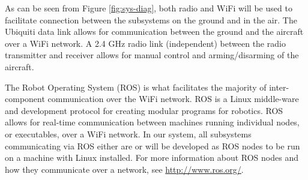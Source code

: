 \documentclass[]{auvsi_doc}
\begin{document}
As can be seen from Figure \ref{fig:sys-diag}, both radio and WiFi will be used to facilitate connection between the subsystems on the ground and in the air. The Ubiquiti data link allows for communication between the ground and the aircraft over a WiFi network. A 2.4 GHz radio link (independent) between the radio transmitter and receiver allows for manual control and arming/disarming of the aircraft.

The Robot Operating System (ROS) is what facilitates the majority of inter-component communication over the WiFi network. ROS is a Linux middle-ware and development protocol for creating modular programs for robotics. ROS allows for real-time communication between machines running individual nodes, or executables, over a WiFi network. In our system, all subsystems communicating via ROS either are or will be developed as ROS nodes to be run on a machine with Linux installed. For more information about ROS nodes and how they communicate over a network, see \url{http://www.ros.org/}.
\end{document}
